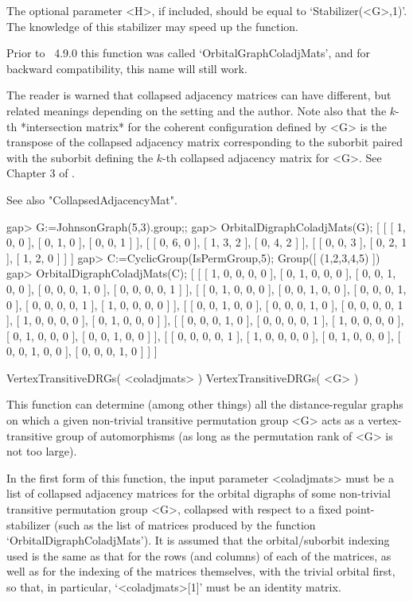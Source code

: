 The optional parameter <H>, if included, should be equal to
`Stabilizer(<G>,1)'. The knowledge of this stabilizer may speed up the
function.

Prior to {\GRAPE}~4.9.0 this function was called `OrbitalGraphColadjMats',
and for backward compatibility, this name will still work.

The reader is warned that collapsed adjacency matrices can have different,
but related meanings depending on the setting and the author. Note also
that the $k$-th *intersection matrix* for the coherent configuration
defined by <G> is the transpose of the collapsed adjacency matrix
corresponding to the suborbit paired with the suborbit defining the
$k$-th collapsed adjacency matrix for <G>. See Chapter 3 of \cite{Cam99}.

See also "CollapsedAdjacencyMat".

\beginexample
gap> G:=JohnsonGraph(5,3).group;;
gap> OrbitalDigraphColadjMats(G);
[ [ [ 1, 0, 0 ], [ 0, 1, 0 ], [ 0, 0, 1 ] ], 
  [ [ 0, 6, 0 ], [ 1, 3, 2 ], [ 0, 4, 2 ] ], 
  [ [ 0, 0, 3 ], [ 0, 2, 1 ], [ 1, 2, 0 ] ] ]
gap> C:=CyclicGroup(IsPermGroup,5);
Group([ (1,2,3,4,5) ])
gap> OrbitalDigraphColadjMats(C);
[ [ [ 1, 0, 0, 0, 0 ], [ 0, 1, 0, 0, 0 ], [ 0, 0, 1, 0, 0 ], 
      [ 0, 0, 0, 1, 0 ], [ 0, 0, 0, 0, 1 ] ], 
  [ [ 0, 1, 0, 0, 0 ], [ 0, 0, 1, 0, 0 ], [ 0, 0, 0, 1, 0 ], 
      [ 0, 0, 0, 0, 1 ], [ 1, 0, 0, 0, 0 ] ], 
  [ [ 0, 0, 1, 0, 0 ], [ 0, 0, 0, 1, 0 ], [ 0, 0, 0, 0, 1 ], 
      [ 1, 0, 0, 0, 0 ], [ 0, 1, 0, 0, 0 ] ], 
  [ [ 0, 0, 0, 1, 0 ], [ 0, 0, 0, 0, 1 ], [ 1, 0, 0, 0, 0 ], 
      [ 0, 1, 0, 0, 0 ], [ 0, 0, 1, 0, 0 ] ], 
  [ [ 0, 0, 0, 0, 1 ], [ 1, 0, 0, 0, 0 ], [ 0, 1, 0, 0, 0 ], 
      [ 0, 0, 1, 0, 0 ], [ 0, 0, 0, 1, 0 ] ] ]
\endexample


\>VertexTransitiveDRGs( <coladjmats> )
\>VertexTransitiveDRGs( <G> )

This function can determine (among other things) all the distance-regular
graphs on which a given non-trivial transitive permutation group <G>
acts as a vertex-transitive group of automorphisms (as long as the
permutation rank of <G> is not too large).

In the first form of this function, the input parameter <coladjmats> must
be a list of collapsed adjacency matrices for the orbital digraphs of some
non-trivial transitive permutation group <G>, collapsed with respect to a
fixed point-stabilizer (such as the list of matrices produced by the function
`OrbitalDigraphColadjMats').  It is assumed that the orbital/suborbit
indexing used is the same as that for the rows (and columns) of each of
the matrices, as well as for the indexing of the matrices themselves,
with the trivial orbital first, so that, in particular, `<coladjmats>[1]'
must be an identity matrix.

